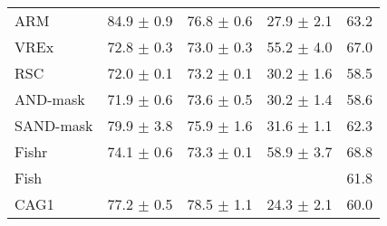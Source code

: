 \documentclass{article}
\begin{document}
\begin{center}
{\begin{tabular}{lcccc}
ARM                  & 84.9 $\pm$ 0.9       & 76.8 $\pm$ 0.6       & 27.9 $\pm$ 2.1       & 63.2                 \\
VREx                 & 72.8 $\pm$ 0.3       & 73.0 $\pm$ 0.3       & 55.2 $\pm$ 4.0       & 67.0                 \\
RSC                  & 72.0 $\pm$ 0.1       & 73.2 $\pm$ 0.1       & 30.2 $\pm$ 1.6       & 58.5                 \\
AND-mask             & 71.9 $\pm$ 0.6       & 73.6 $\pm$ 0.5       & 30.2 $\pm$ 1.4       & 58.6                 \\
SAND-mask            & 79.9 $\pm$ 3.8       & 75.9 $\pm$ 1.6       & 31.6 $\pm$ 1.1       & 62.3                 \\
Fishr                & 74.1 $\pm$ 0.6       & 73.3 $\pm$ 0.1       & 58.9 $\pm$ 3.7       & 68.8                 \\
Fish                 &                      &                      &                      & 61.8                 \\
\midrule
CAG1                 & 77.2 $\pm$ 0.5       & 78.5 $\pm$ 1.1       & 24.3 $\pm$ 2.1       & 60.0                 \\

\bottomrule
\end{tabular}}
\end{center}
\end{document}
